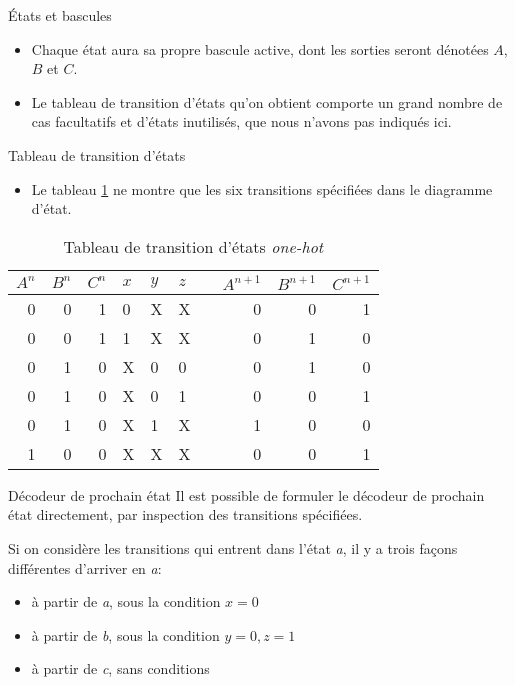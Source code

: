 \documentclass[presentation]{beamer}
\begin{document}
\begin{frame}[label={sec:orgfceb1d9}]{États et bascules}
\begin{itemize}
\item Chaque état aura sa propre bascule active, dont les sorties seront dénotées \(A\), \(B\) et \(C\).

\item Le tableau de transition d'états qu'on obtient comporte un grand nombre de cas facultatifs et d'états inutilisés, que nous n'avons pas indiqués ici.
\end{itemize}
\end{frame}

\begin{frame}[label={sec:orge612a48}]{Tableau de transition d'états}
\begin{itemize}
\item Le tableau \ref{tab:org1394e2a} ne montre que les six transitions spécifiées dans le diagramme d'état.
\end{itemize}

\begin{table}[htbp]
\caption{\label{tab:org1394e2a}Tableau de transition d'états \emph{one-hot}}
\centering
\begin{tabular}{rrrllllrrr}
\(A^n\) & \(B^n\) & \(C^n\) & \(x\) & \(y\) & \(z\) &  & \(A^{n+1}\) & \(B^{n+1}\) & \(C^{n+1}\)\\
\hline
0 & 0 & 1 & 0 & X & X &  & 0 & 0 & 1\\
0 & 0 & 1 & 1 & X & X &  & 0 & 1 & 0\\
0 & 1 & 0 & X & 0 & 0 &  & 0 & 1 & 0\\
0 & 1 & 0 & X & 0 & 1 &  & 0 & 0 & 1\\
0 & 1 & 0 & X & 1 & X &  & 1 & 0 & 0\\
1 & 0 & 0 & X & X & X &  & 0 & 0 & 1\\
\end{tabular}
\end{table}
\end{frame}

\begin{frame}[label={sec:orgfb434a0}]{Décodeur de prochain état}
Il est possible de formuler le décodeur de prochain état directement,
par inspection des transitions spécifiées.  

Si on considère les transitions qui entrent dans l'état \emph{a}, il y a trois façons différentes d'arriver en \emph{a}:
\begin{itemize}
\item à partir de \emph{a}, sous la condition \(x=0\)
\item à partir de \emph{b}, sous la condition \(y=0, z=1\)
\item à partir de \emph{c}, sans conditions
\end{itemize}
\end{frame}
\end{document}
